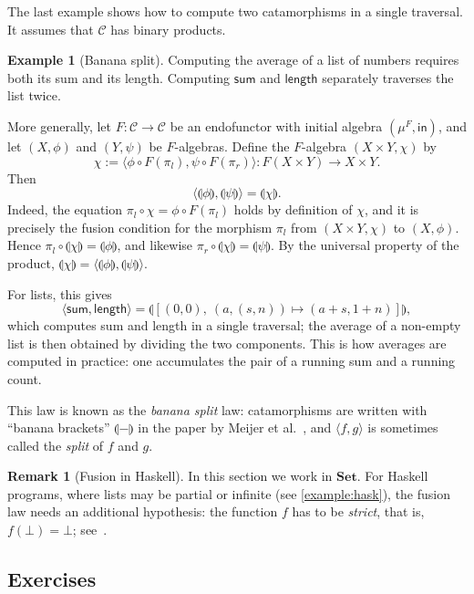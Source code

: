 \documentclass[a4paper,11pt, oneside,titlepage=false]{scrbook}
\theoremstyle{plain}
\theoremstyle{definition}
\newtheorem{rem}[thm]{Remark}
\newtheorem{exa}[thm]{Example}
\newcommand{\Cat}[1]{\mathcal{#1}}
\newcommand{\CC}{\Cat{C}}
\newcommand{\Catb}[1]{\mathbf{#1}}
\newcommand{\SET}{\Catb{Set}}
\newcommand{\projl}{\ensuremath{\pi_l}}
\newcommand{\projr}{\ensuremath{\pi_r}}
\newcommand{\intoproduct}[2]{\ensuremath{\langle #1, #2 \rangle}}
\newcommand{\Initalg}[1]{\ensuremath{\mu^{#1}}}
\newcommand{\catam}[1]{\llparenthesis #1 \rrparenthesis}
\newcommand{\In}{\ensuremath{\mathsf{in}}}
\begin{document}
The last example shows how to compute two catamorphisms in a single traversal.
It assumes that $\CC$ has binary products.

\begin{exa}[Banana split]\label{exa:banana-split}
  Computing the average of a list of numbers requires both its sum and its length.
  Computing $\mathsf{sum}$ and $\mathsf{length}$ separately traverses the list twice.

  More generally, let $F : \CC \to \CC$ be an endofunctor with initial algebra $(\Initalg{F}, \In)$, and let $(X, \phi)$ and $(Y, \psi)$ be $F$-algebras.
  Define the $F$-algebra $(X \times Y, \chi)$ by
  \[ \chi := \intoproduct{\phi \circ F(\projl)}{\psi \circ F(\projr)} : F(X \times Y) \to X \times Y. \]
  Then
  \[ \intoproduct{\catam{\phi}}{\catam{\psi}} = \catam{\chi}. \]
  Indeed, the equation $\projl \circ \chi = \phi \circ F(\projl)$ holds by definition of $\chi$, and it is precisely the fusion condition for the morphism $\projl$ from $(X \times Y, \chi)$ to $(X, \phi)$.
  Hence $\projl \circ \catam{\chi} = \catam{\phi}$, and likewise $\projr \circ \catam{\chi} = \catam{\psi}$.
  By the universal property of the product, $\catam{\chi} = \intoproduct{\catam{\phi}}{\catam{\psi}}$.

  For lists, this gives
  \[ \intoproduct{\mathsf{sum}}{\mathsf{length}} = \catam{[(0,0),\ (a, (s, n)) \mapsto (a + s, 1 + n)]}, \]
  which computes sum and length in a single traversal; the average of a non-empty list is then obtained by dividing the two components.
  This is how averages are computed in practice: one accumulates the pair of a running sum and a running count.

  This law is known as the \emph{banana split} law: catamorphisms are written with ``banana brackets'' $\catam{-}$ in the paper by Meijer et al.~\cite{DBLP:conf/fpca/MeijerFP91}, and $\intoproduct{f}{g}$ is sometimes called the \emph{split} of $f$ and $g$.
\end{exa}

\begin{rem}[Fusion in Haskell]
  In this section we work in $\SET$.
  For Haskell programs, where lists may be partial or infinite (see \cref{example:hask}), the fusion law needs an additional hypothesis: the function $f$ has to be \emph{strict}, that is, $f(\bot) = \bot$; see~\cite{DBLP:conf/fpca/MeijerFP91}.
\end{rem}

\subsection{Exercises}
\end{document}
